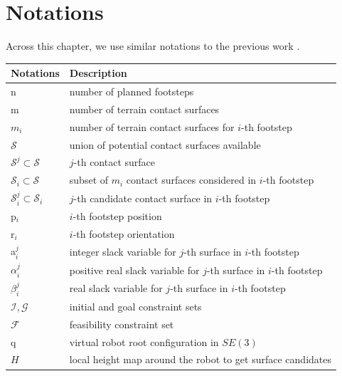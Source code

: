 \section{Notations}
\label{sub:mip:notations}
Across this chapter, we use similar notations to the previous work \cite{sl1m_v2}.
\begin{center}
\begin{tabular}{ l l } 
    \hline
    \textbf{Notations} & \textbf{Description} \\ 
    \hline
    n                  & number of planned footsteps \\ 
    m                  & number of terrain contact surfaces \\ 
    $m_i$                & number of terrain contact surfaces for $i$-th footstep \\
    $\mathcal{S}$      & union of potential contact surfaces available \\
    $\mathcal{S}^j \subset \mathcal{S}$     & $j$-th contact surface \\
    $\mathcal{S}_i \subset \mathcal{S}$     & subset of $m_i$ contact surfaces considered in $i$-th footstep \\ 
    $\mathcal{S}_i^j \subset \mathcal{S}_i$ & $j$-th candidate contact surface in $i$-th footstep \\ 
    p$_i$              & $i$-th footstep position\\ 
    r$_i$              & $i$-th footstep orientation\\
    a$_i^j$            & integer slack variable for $j$-th surface in $i$-th footstep \\ 
    $\alpha_i^j$       & positive real slack variable for $j$-th surface in $i$-th footstep \\ 
    $\beta_i^j$        & real slack variable for $j$-th surface in $i$-th footstep \\
	$\mathcal{I}, \mathcal{G}$      & initial and goal constraint sets \\
    $\mathcal{F}$      & feasibility constraint set \\
    q              & virtual robot root configuration in $SE(3)$\\
    $H$              & local height map around the robot to get surface candidates\\
    \hline
\end{tabular}
\end{center}

